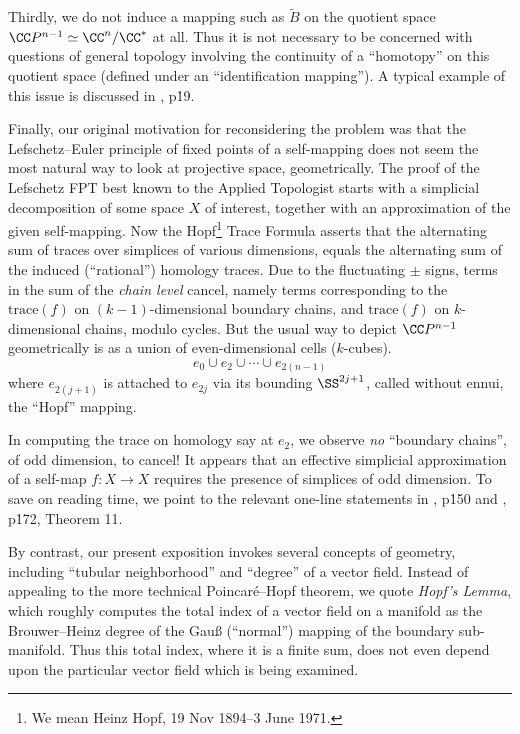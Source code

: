 Thirdly, we do not induce a mapping such as $\tilde{B}$ on the quotient space $\CC P^{n-1} \simeq \CC^n/\CC^{*}$ at all. Thus it is not necessary to be concerned with questions of general topology involving the continuity of a ``homotopy'' on this quotient space (defined under an ``identification mapping''). A typical example of this issue is discussed in \cite{Maunder}, p\. 19.

Finally, our original motivation for reconsidering the problem was that the Lefschetz--Euler principle of fixed points of a self-mapping does not seem the most natural way to look at projective space, geometrically. The proof of the Lefschetz FPT best known to the Applied Topologist starts with a simplicial decomposition of some space $X$ of interest, together with an approximation of the given self-mapping. Now the Hopf\footnote{We mean Heinz Hopf, 19 Nov 1894--3 June 1971.} Trace Formula asserts that  the alternating sum of traces over simplices of various dimensions, equals the alternating sum of the induced (``rational'') homology traces. Due to the fluctuating $\pm$ signs, terms in the sum of the {\it chain level} cancel, namely terms corresponding to the $\mbox{trace}(f)$ on $(k-1)$-dimensional boundary chains, and $\mbox{trace}(f)$ on $k$-dimensional chains, modulo cycles. But  the usual way to depict $\CC P^{n-1}$ geometrically is as a union of even-dimensional cells ($k$-cubes).
$$e_0 \cup e_2 \cup \cdots \cup e_{2(n-1)}$$
where $e_{2(j+1)}$ is attached to $e_{2j}$ via its bounding $\SS^{2j+1}$, called without ennui, the ``Hopf'' mapping.

In computing the trace on homology say at $e_2$, we observe {\it no} ``boundary chains'', of odd dimension, to cancel! It appears that an effective simplicial approximation of a self-map $f: X \to X$ requires the presence of simplices of odd dimension. To save on reading time, we point to the relevant one-line statements in \cite{Maunder}, \linebreak p\. 150 and \cite{Spanier}, p\. 172, Theorem 11.

By contrast, our present exposition invokes several concepts of geometry, including ``tubular neighborhood'' and ``degree'' of a vector field.  Instead of appealing to the more technical Poincar\'e--Hopf theorem, we quote {\it Hopf's Lemma}, which roughly computes the total index of a vector field on a manifold as the Brouwer--Heinz degree of the Gau{\ss} (``normal'') mapping of the boundary sub-manifold.  Thus this total index, where it is a finite sum, does not even depend upon the particular vector field which is being examined.


